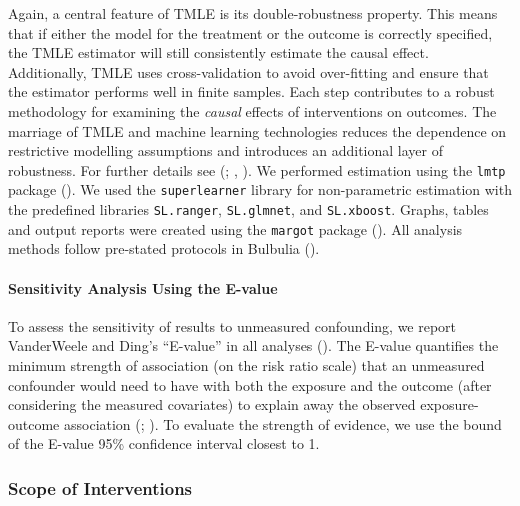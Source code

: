 \documentclass[
  single column]{article}
\let\oldparagraph\paragraph
\renewcommand{\paragraph}[1]{\oldparagraph{#1}\mbox{}}
\begin{document}
Again, a central feature of TMLE is its double-robustness property. This
means that if either the model for the treatment or the outcome is
correctly specified, the TMLE estimator will still consistently estimate
the causal effect. Additionally, TMLE uses cross-validation to avoid
over-fitting and ensure that the estimator performs well in finite
samples. Each step contributes to a robust methodology for examining the
\emph{causal} effects of interventions on outcomes. The marriage of TMLE
and machine learning technologies reduces the dependence on restrictive
modelling assumptions and introduces an additional layer of robustness.
For further details see (; ,
). We performed estimation using the
\texttt{lmtp} package (). We used the \texttt{superlearner} library for non-parametric
estimation with the predefined libraries \texttt{SL.ranger},
\texttt{SL.glmnet}, and \texttt{SL.xboost}. Graphs, tables and output
reports were created using the \texttt{margot} package
(). All analysis methods follow
pre-stated protocols in Bulbulia
().

\paragraph{Sensitivity Analysis Using the
E-value}\label{sensitivity-analysis-using-the-e-value}

To assess the sensitivity of results to unmeasured confounding, we
report VanderWeele and Ding's ``E-value'' in all analyses
(). The E-value
quantifies the minimum strength of association (on the risk ratio scale)
that an unmeasured confounder would need to have with both the exposure
and the outcome (after considering the measured covariates) to explain
away the observed exposure-outcome association
(;
). To
evaluate the strength of evidence, we use the bound of the E-value 95\%
confidence interval closest to 1.

\subsubsection{Scope of Interventions}\label{scope-of-interventions}
\end{document}
